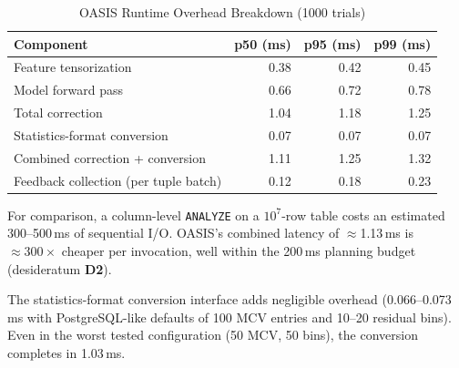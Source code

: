 \documentclass[runningheads]{llncs}
\begin{document}
\begin{table}[h]
\centering
\caption{OASIS Runtime Overhead Breakdown (1000 trials)}
\label{tab:overhead}
\begin{tabular}{l r r r}
\toprule
Component & p50 (ms) & p95 (ms) & p99 (ms) \\
\midrule
Feature tensorization       & 0.38 & 0.42 & 0.45 \\
Model forward pass          & 0.66 & 0.72 & 0.78 \\
Total correction            & 1.04 & 1.18 & 1.25 \\
Statistics-format conversion & 0.07 & 0.07 & 0.07 \\
Combined correction + conversion & 1.11 & 1.25 & 1.32 \\
\midrule
Feedback collection (per tuple batch) & 0.12 & 0.18 & 0.23 \\
\bottomrule
\end{tabular}
\end{table}

For comparison, a column-level \texttt{ANALYZE} on a $10^7$-row table costs an
estimated 300--500\,ms of sequential I/O. OASIS's combined latency of
$\approx$1.13\,ms is ${\approx}300\times$ cheaper per invocation, well within
the 200\,ms planning budget (desideratum \textbf{D2}).

The statistics-format conversion interface adds negligible overhead
(0.066--0.073\,ms with PostgreSQL-like defaults of 100 MCV entries and 10--20
residual bins). Even in the worst tested configuration (50 MCV, 50 bins), the
conversion completes in 1.03\,ms.



\end{document}
